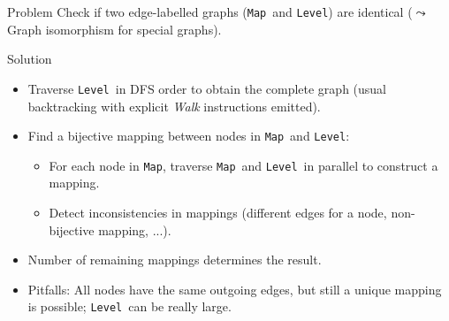 \begin{slide}
	\newcommand{\Map}[0]{\texttt{Map}}
	\newcommand{\Level}[0]{\texttt{Level}}
	\begin{block}{Problem}
		Check if two edge-labelled graphs (\Map\ and \Level) are identical ($\leadsto$ Graph isomorphism for special graphs).
	\end{block}
	\pause
	\begin{block}{Solution}
		\begin{itemize}
			\item Traverse \Level\ in DFS order to obtain the complete graph (usual backtracking with explicit \textit{Walk} instructions emitted).
			\item Find a bijective mapping between nodes in \Map\ and \Level:
				\begin{itemize}
					\item For each node in \Map, traverse \Map\ and \Level\ in parallel to construct a mapping.
					\item Detect inconsistencies in mappings (different edges for a node, non-bijective mapping, ...).
				\end{itemize}
			\item Number of remaining mappings determines the result.
			\item Pitfalls: All nodes have the same outgoing edges, but still a unique mapping is possible; \Level\ can be really large.
		\end{itemize}
	\end{block}
\end{slide} 
